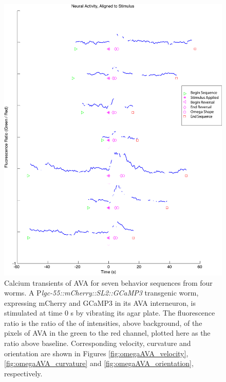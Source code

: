 \begin{figure}  %
\includegraphics[width=\textwidth]{figures/omegaAVA_aggregate}
\caption[Neural activity of AVA for seven sequences from four worms.]{Calcium transients of AVA for seven behavior sequences from four worms.  A P\textit{lgc-55::mCherry::SL2::GCaMP3} transgenic worm, expressing mCherry and GCaMP3 in its AVA interneuron, is stimulated at time 0 s by vibrating its agar plate. The fluorescence ratio is the ratio of the of intensities,  above background, of the pixels of AVA in the green to the red channel, plotted here as the ratio above baseline.  Corresponding velocity, curvature and orientation are shown in Figures \ref{fig:omegaAVA_velocity}, \ref{fig:omegaAVA_curvature} and \ref{fig:omegaAVA_orientation}, respectively. 
 \label{fig:omegaAVA_aggregate}}
\end{figure}



